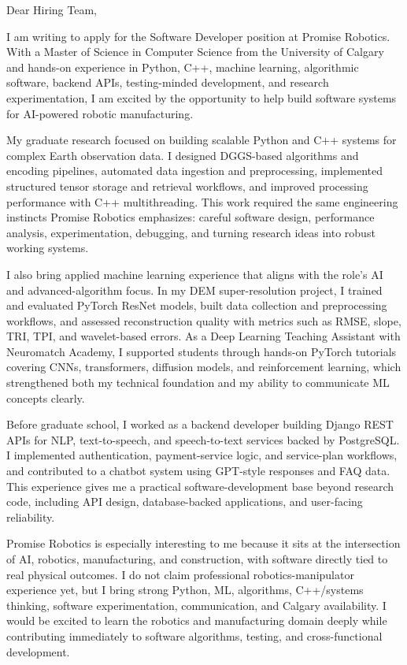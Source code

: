 \documentclass[11pt]{letter}
\begin{document}
\begin{letter}{}

\opening{Dear Hiring Team,}

I am writing to apply for the Software Developer position at Promise Robotics. With a Master of Science in Computer Science from the University of Calgary and hands-on experience in Python, C++, machine learning, algorithmic software, backend APIs, testing-minded development, and research experimentation, I am excited by the opportunity to help build software systems for AI-powered robotic manufacturing.

My graduate research focused on building scalable Python and C++ systems for complex Earth observation data. I designed DGGS-based algorithms and encoding pipelines, automated data ingestion and preprocessing, implemented structured tensor storage and retrieval workflows, and improved processing performance with C++ multithreading. This work required the same engineering instincts Promise Robotics emphasizes: careful software design, performance analysis, experimentation, debugging, and turning research ideas into robust working systems.

I also bring applied machine learning experience that aligns with the role's AI and advanced-algorithm focus. In my DEM super-resolution project, I trained and evaluated PyTorch ResNet models, built data collection and preprocessing workflows, and assessed reconstruction quality with metrics such as RMSE, slope, TRI, TPI, and wavelet-based errors. As a Deep Learning Teaching Assistant with Neuromatch Academy, I supported students through hands-on PyTorch tutorials covering CNNs, transformers, diffusion models, and reinforcement learning, which strengthened both my technical foundation and my ability to communicate ML concepts clearly.

Before graduate school, I worked as a backend developer building Django REST APIs for NLP, text-to-speech, and speech-to-text services backed by PostgreSQL. I implemented authentication, payment-service logic, and service-plan workflows, and contributed to a chatbot system using GPT-style responses and FAQ data. This experience gives me a practical software-development base beyond research code, including API design, database-backed applications, and user-facing reliability.

Promise Robotics is especially interesting to me because it sits at the intersection of AI, robotics, manufacturing, and construction, with software directly tied to real physical outcomes. I do not claim professional robotics-manipulator experience yet, but I bring strong Python, ML, algorithms, C++/systems thinking, software experimentation, communication, and Calgary availability. I would be excited to learn the robotics and manufacturing domain deeply while contributing immediately to software algorithms, testing, and cross-functional development.


\end{letter}
\end{document}

